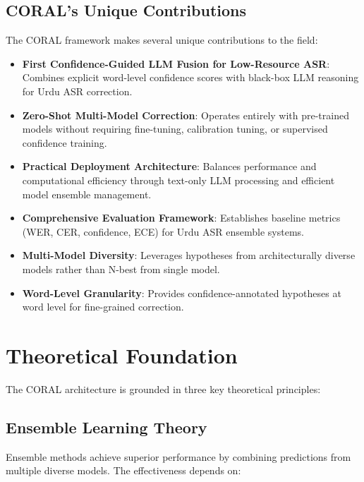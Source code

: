 \subsection{CORAL's Unique Contributions}

The CORAL framework makes several unique contributions to the field:

\begin{itemize}[topsep=4pt,itemsep=2pt]
    \item \textbf{First Confidence-Guided LLM Fusion for Low-Resource ASR}: Combines explicit word-level confidence scores with black-box LLM reasoning for Urdu ASR correction.
    
    \item \textbf{Zero-Shot Multi-Model Correction}: Operates entirely with pre-trained models without requiring fine-tuning, calibration tuning, or supervised confidence training.
    
    \item \textbf{Practical Deployment Architecture}: Balances performance and computational efficiency through text-only LLM processing and efficient model ensemble management.
    
    \item \textbf{Comprehensive Evaluation Framework}: Establishes baseline metrics (WER, CER, confidence, ECE) for Urdu ASR ensemble systems.
    
    \item \textbf{Multi-Model Diversity}: Leverages hypotheses from architecturally diverse models rather than N-best from single model.
    
    \item \textbf{Word-Level Granularity}: Provides confidence-annotated hypotheses at word level for fine-grained correction.
\end{itemize}

\section{Theoretical Foundation}

The CORAL architecture is grounded in three key theoretical principles:

\subsection{Ensemble Learning Theory}

Ensemble methods achieve superior performance by combining predictions from multiple diverse models. The effectiveness depends on:

